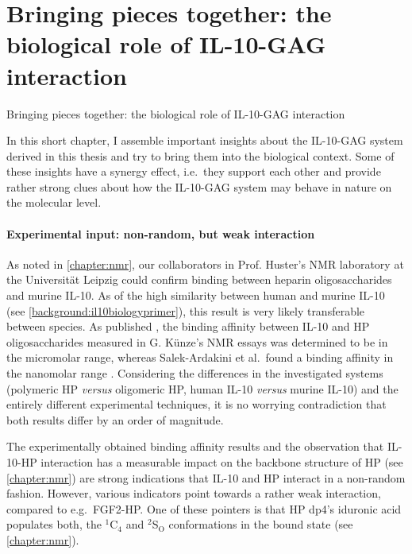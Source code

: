 \chapter{Bringing pieces together: the biological role of IL-10-GAG interaction}
\label{together}
%
{Bringing pieces together: the biological role of IL-10-GAG interaction}

In this short chapter, I assemble important insights about the IL-10-GAG system
derived in this thesis and try to bring them into the biological context. Some
of these insights have a synergy effect, i.e.\ they support each other and
provide rather strong clues about how the IL-10-GAG system may behave in nature
on the molecular level.


\subsubsection{Experimental input: non-random, but weak interaction}

As noted in \cref{chapter:nmr}, our collaborators in Prof. Huster's NMR
laboratory at the Universität Leipzig could confirm binding between heparin
oligosaccharides and murine IL-10. As of the high similarity between human and
murine IL-10 (see \cref{background:il10biologyprimer}), this result is very
likely transferable between species. As published \cite{kuenze_gehrcke_2014},
the binding affinity between IL-10 and HP oligosaccharides measured in G.
Künze's NMR essays was determined to be in the micromolar range, whereas
Salek-Ardakini et al.\ found a binding affinity in the nanomolar range
\cite{salek_ardakani_2000}. Considering the differences in the investigated
systems (polymeric HP \textit{versus} oligomeric HP, human IL-10 \textit{versus}
murine IL-10) and the entirely different experimental techniques, it is no
worrying contradiction that both results differ by an order of magnitude.

The experimentally obtained binding affinity results and the observation that
IL-10-HP interaction has a measurable impact on the backbone structure of HP
(see \cref{chapter:nmr}) are strong indications that IL-10 and HP interact in a
non-random fashion. However, various indicators point towards a rather weak
interaction, compared to e.g.\ FGF2-HP. One of these pointers is that HP dp4's
iduronic acid populates both, the ${}^1$C${}_4$ and ${}^2$S${}_\mathrm{O}$
conformations in the bound state (see \cref{chapter:nmr}).


